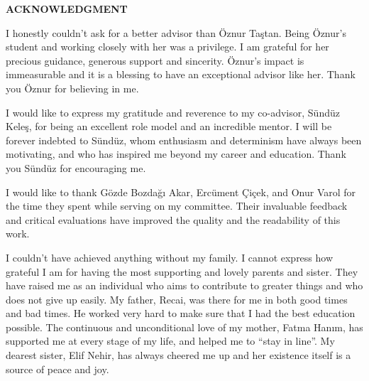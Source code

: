 \clearpage
\setlength{\parindent}{0pt}
\begin{center}
	\MakeUppercase{\textbf{acknowledgment}} \\ [3\baselineskip]
\end{center}

I honestly couldn't ask for a better advisor than Öznur Taştan.
Being Öznur's student and working closely with her was a privilege.
I am grateful for her precious guidance, generous support and sincerity.
Öznur's impact is immeasurable and it is a blessing to have an exceptional advisor like her.
Thank you Öznur for believing in me.

I would like to express my gratitude and reverence to my co-advisor, Sündüz Keleş, for being an excellent role model and an incredible mentor.
I will be forever indebted to Sündüz, whom enthusiasm and determinism have always been motivating, and who has inspired me beyond my career and education.
Thank you Sündüz for encouraging me.


I would like to thank Gözde Bozdağı Akar, Ercüment Çiçek, and Onur Varol for the time they spent while serving on my committee.
Their invaluable feedback and critical evaluations have improved the quality and the readability of this work.


I couldn't have achieved anything without my family.
I cannot express how grateful I am for having the most supporting and lovely parents and sister.
They have raised me as an individual who aims to contribute to greater things and who does not give up easily.
My father, Recai, was there for me in both good times and bad times.
He worked very hard to make sure that I had the best education possible.
The continuous and unconditional love of my mother, Fatma Hanım, has supported me at every stage of my life, and helped me to ``stay in line''.
My dearest sister, Elif Nehir, has always cheered me up and her existence itself is a source of peace and joy.


